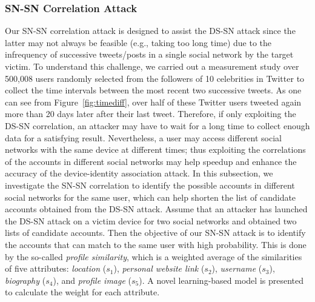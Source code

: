 \documentclass[letterpaper,12pt]{article}
\begin{document}
\subsubsection{SN-SN Correlation Attack}
\label{sec:snsnattack}
Our SN-SN correlation attack is designed to assist the DS-SN attack since the latter may not always be feasible (e.g., taking too long time) due to the infrequency of successive tweets/posts in a single social network by the target victim. To understand this challenge, we carried out a measurement study over 500,008 users randomly selected from the followers of 10 celebrities in Twitter to collect the time intervals between the most recent two successive tweets. As one can see from Figure~\ref{fig:timediff}, over half of these Twitter users tweeted again more than 20 days later after their last tweet. Therefore, if only exploiting the DS-SN correlation, an attacker may have to wait for a long time to collect enough data for a satisfying result. Nevertheless, a user may access different social networks with the same device at different times; thus exploiting the correlations of the accounts in different social networks may help speedup and enhance the accuracy of the device-identity association attack. In this subsection, we investigate the SN-SN correlation to identify the possible accounts in different social networks for the same user, which can help shorten the list of candidate accounts obtained from the DS-SN attack. Assume that an attacker has launched the DS-SN attack on a victim device for two social networks and obtained two lists of candidate accounts. Then the objective of our SN-SN attack is to identify the accounts that can match to the same user with high probability. This is done by the so-called \emph{profile similarity}, which is a weighted average of the similarities of five attributes:  \textit{location} ($s_1$), \textit{personal website link} ($s_2$), \textit{username} ($s_3$), \textit{biography} ($s_4$), and \textit{profile image} ($s_5$). A novel learning-based model is presented to calculate the weight for each attribute.  %
\end{document}
